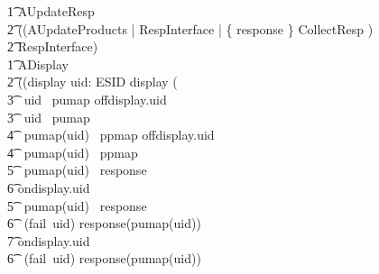 \begin{circus}
        \t1 AUpdateResp \circdef \\
        \t2 ((AUpdateProducts \lpar \emptyset | RespInterface | \{ response \} \rpar CollectResp ) \\
        \t2 \circhide RespInterface) \\
%
%
        \t1 ADisplay \circdef \\
        \t2 ((\lpar \lchanset display \rchanset \rpar uid: ESID \circspot \lpar \emptyset \rpar display \then ( \\
        \t3 \circif\ uid \notin \dom~pumap \circthen offdisplay.uid \then \Skip\\
        \t3 \circelse\ uid \in \dom~pumap \circthen \\
            \t4 \circif\ pumap(uid) \notin \dom~ppmap \circthen offdisplay.uid \then \Skip\\
            \t4 \circelse\ pumap(uid) \in \dom~ppmap \circthen \\
                \t5 \circif\ pumap(uid) \notin \dom~response \circthen \\
                    \t6 ondisplay.uid \then \Skip\\
                \t5 \circelse\ pumap(uid) \in \dom~response \circthen \\
                    \t6 \circif\ (fail\sym~uid) \notin response(pumap(uid)) \circthen \\
                    \t7 ondisplay.uid \then \Skip\\
                    \t6 \circelse\ (fail\sym~uid) \in response(pumap(uid)) \circthen \\

\end{circus}

